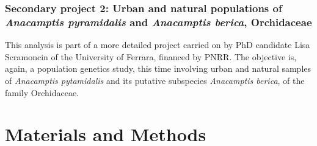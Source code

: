 \documentclass[a4paper, 12pt]{report}
\begin{document}
\subsection{Secondary project 2: Urban and natural populations of \textit{Anacamptis pyramidalis} and \textit{Anacamptis berica}, Orchidaceae}
This analysis is part of a more detailed project carried on by PhD candidate Lisa Scramoncin of the University of Ferrara, financed by PNRR. The objective is, again, a population genetics study, this time involving urban and natural samples of \textit{Anacamptis pytamidalis} and its putative subspecies \textit{Anacamptis berica}, of the family Orchidaceae.



\clearpage
\chapter{Materials and Methods} \label{Materials and Methods}
\end{document}
